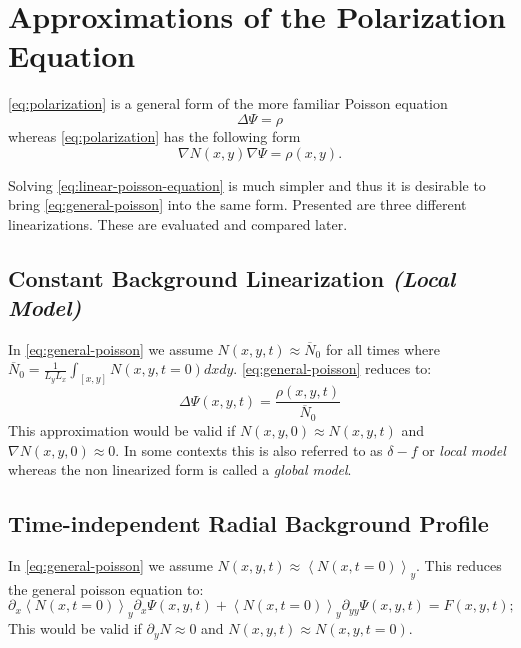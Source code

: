 \documentclass[master.tex]{subfiles}
\begin{document}
\section{Approximations of the Polarization Equation} \label{sec:polarization-linearizations}
\autoref{eq:polarization} is a general form of the more familiar Poisson equation
\begin{equation}\label{eq:linear-poisson-equation}
    \Delta \Psi = \rho 
\end{equation}
whereas \autoref{eq:polarization} has the following form
\begin{equation}\label{eq:general-poisson}
    \nabla N(x,y) \nabla \Psi = \rho(x,y).
\end{equation}

Solving \autoref{eq:linear-poisson-equation} is much simpler and thus it is desirable to bring \autoref{eq:general-poisson} into the same form. Presented are three different linearizations. These are evaluated and compared later.

\subsection{Constant Background Linearization \textit{(Local Model)}}

In \autoref{eq:general-poisson} we assume $N(x,y, t) \approx \overline{N}_0$ for all times where $\overline{N}_0=\frac{1}{L_yL_x}\int_{[x,y]} N(x,y, t = 0) dx dy$. \autoref{eq:general-poisson} reduces to:
\begin{equation}
    \Delta \Psi(x,y,t) = \frac{\rho(x,y,t)}{\overline{N}_0}
\end{equation}
This approximation would be valid if $N(x,y, 0) \approx N(x,y,t)$ and $\nabla N(x,y,0) \approx 0$. In some contexts this is also referred to as  $\delta-f$ or \textit{local model} whereas the non linearized form is called a \textit{global model}.

\subsection{Time-independent Radial Background Profile}
In \autoref{eq:general-poisson} we assume $N(x,y,t) \approx \left<N(x,t = 0)\right>_y$. This reduces the general poisson equation to:
\begin{equation}
    \partial_x \left<N(x,t = 0)\right>_y \partial_x \Psi(x,y,t) + \left<N(x,t = 0)\right>_y \partial_{yy} \Psi(x,y,t) = F(x,y,t);
\end{equation}
This would be valid if $\partial_y N \approx 0$ and $N(x,y,t) \approx N(x,y, t= 0)$.
\end{document}
